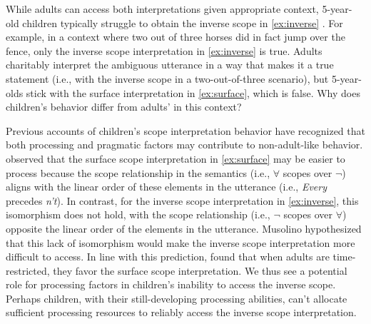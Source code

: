 \documentclass[10pt,a4paper]{article}
\newcommand{\gcs}[1]{\textcolor{blue}{[gcs: #1]}}
\begin{document}
While adults can access both interpretations given appropriate context,  5-year-old children typically struggle to obtain the inverse scope in \ref{ex:inverse} .  For example, in a context where two out of three horses did in fact jump over the fence, only the inverse scope interpretation in \ref{ex:inverse} is true. 
Adults 
charitably interpret the ambiguous utterance in a way that makes it a true statement (i.e., with the inverse scope in a two-out-of-three scenario), but  5-year-olds 
stick with the surface interpretation in \ref{ex:surface}, which is false. Why does children's behavior differ from adults' in this context?

Previous accounts of children's scope interpretation behavior have recognized that both processing and pragmatic factors may contribute to non-adult-like behavior.
 observed that the surface scope  interpretation in \ref{ex:surface} may be easier to process because  the scope  relationship in the semantics (i.e., $\forall$ scopes over $\neg$) aligns with the  linear order of these elements in the utterance (i.e., \textit{Every} precedes \textit{n't}). In contrast, for the inverse scope interpretation in \ref{ex:inverse}, this isomorphism does not hold,  with the scope relationship (i.e., $\neg$ scopes over $\forall$) opposite the linear order of the elements in the utterance. Musolino hypothesized that this lack of isomorphism would make the inverse scope interpretation more difficult to access. 
In line with this prediction, 
 found that when adults are time-restricted, they favor the surface scope interpretation. 
We thus see a potential role for processing factors in children's inability to access the inverse scope. Perhaps children, with their still-developing processing abilities, can't allocate sufficient processing resources to reliably access the  %
inverse scope interpretation.
\end{document}
